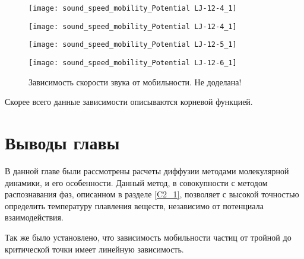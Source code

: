 \begin{figure}[h]
\begin{center}
\begin{minipage}[h]{0.45\linewidth}
\texttt{[image: sound\_speed\_mobility\_Potential LJ-12-4\_1]}
\end{minipage}
\begin{minipage}[h]{0.45\linewidth}
\texttt{[image: sound\_speed\_mobility\_Potential LJ-12-4\_1]}
\end{minipage}

\begin{minipage}[h]{0.45\linewidth}
\texttt{[image: sound\_speed\_mobility\_Potential LJ-12-5\_1]}
\end{minipage}
\begin{minipage}[h]{0.45\linewidth}
\texttt{[image: sound\_speed\_mobility\_Potential LJ-12-6\_1]}
\end{minipage}
\caption{Зависимость скорости звука от мобильности. Не доделана!}
\label{risCMu}
\end{center}
\end{figure}

Скорее всего данные зависимости описываются корневой функцией.


\section{Выводы главы}\label{C3_3}

В данной главе были рассмотрены расчеты диффузии методами молекулярной динамики, и его особенности. Данный метод, в совокупности с методом распознавания фаз, описанном в разделе \ref{C2_1}, позволяет с высокой точностью определить температуру плавления веществ, независимо от потенциала взаимодействия.

Так же было установлено, что зависимость мобильности частиц от тройной до критической точки имеет линейную зависимость.

